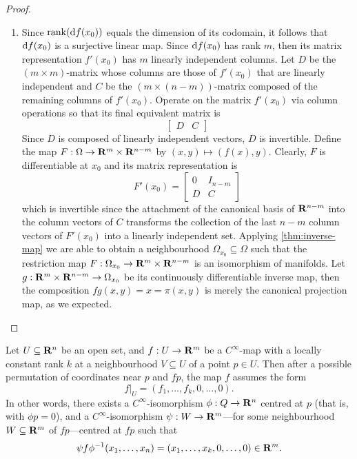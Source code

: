 \begin{proof}
\begin{enumerate}
  \item Since \(\operatorname{rank}(\mathrm{d} f(x_0))\) equals the dimension of its codomain, it
    follows that \(\mathrm{d} f(x_0)\) is a surjective linear map. Since \(\mathrm{d}
    f(x_0)\) has rank \(m\), then its matrix representation \(f'(x_0)\) has
    \(m\) linearly independent columns. Let \(D\) be the \((m \times m)\)-matrix
    whose columns
    are those of \(f'(x_0)\) that are linearly independent and \(C\) be the
    \((m \times (n - m))\)-matrix composed of the remaining columns of
    \(f'(x_0)\). Operate on the matrix \(f'(x_0)\) via column operations so
    that its final equivalent matrix is
    \[
      \begin{bmatrix}
        D & C
      \end{bmatrix}
    \]
    Since \(D\) is composed of linearly independent vectors, \(D\) is
    invertible. Define the map \(F: \Omega \to \mathbf{R}^m \times \mathbf{R}^{n-m}\) by \((x, y) \mapsto (f(x),
    y)\). Clearly, \(F\) is differentiable at \(x_0\) and its matrix
    representation is
    \[
      F'(x_0) =
      \begin{bmatrix}
        0 & I_{n - m}\\
        D & C
      \end{bmatrix}
    \]
    which is invertible since the attachment of the canonical basis of
    \(\mathbf{R}^{n-m}\) into the column vectors of \(C\) transforms the collection of
    the last \(n - m\) column vectors of \(F'(x_{0})\) into a linearly
    independent set. Applying \cref{thm:inverse-map} we are able to obtain a
    neighbourhood \(\Omega_{x_0} \subseteq \Omega\) such that the restriction map \(F: \Omega_{x_0} \to
    \mathbf{R}^m \times\mathbf{R}^{n-m}\) is an isomorphism of manifolds. Let \(g: \mathbf{R}^m \times \mathbf{R}^{n-m} \to
    \Omega_{x_0}\) be its continuously differentiable inverse map, then the
    composition \(f g(x, y) = x = \pi(x, y)\) is merely the canonical projection
    map, as we expected.
\end{enumerate}
\end{proof}

\begin{theorem}
\label{thm:constant-rank-theorem}
Let \(U \subseteq \mathbf{R}^n\) be an open set, and \(f: U \to \mathbf{R}^m\) be a
\(C^{\infty}\)-map with a locally constant rank \(k\) at a neighbourhood
\(V \subseteq U\) of a point \(p \in U\). Then after a possible permutation of
coordinates near \(p\) and \(f p\), the map \(f\) assumes the form
\[
f|_U  = (f_1, \dots, f_k, 0, \dots, 0).
\]
In other words, there exists a \(C^{\infty}\)-isomorphism \(\phi: Q \to \mathbf{R}^n\)
centred at \(p\) (that is, with \(\phi p = 0\)), and a
\(C^{\infty}\)-isomorphism \(\psi: W \to \mathbf{R}^m\)---for some neighbourhood
\(W \subseteq \mathbf{R}^m\) of \(f p\)---centred at \(f p\) such that
\begin{equation}\label{eq:const-rnk-thm}
\psi f \phi^{-1}(x_1, \dots, x_n) = (x_1, \dots, x_k, 0, \dots, 0) \in \mathbf{R}^m.
\end{equation}
\end{theorem}

